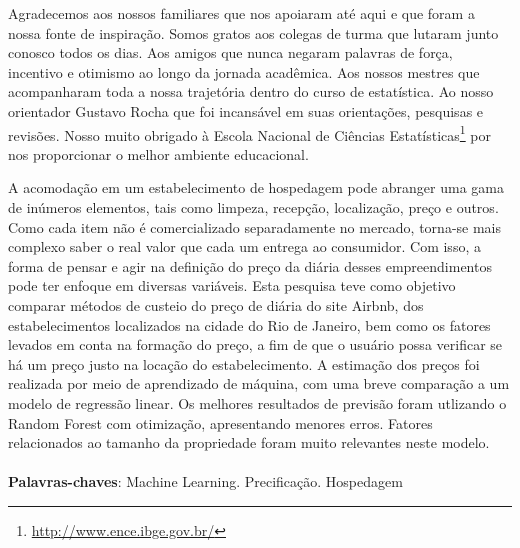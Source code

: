 \documentclass[
	12pt,				%
	a4paper,		%
	oneside,    %
	chapter=TITLE,		   %
	section=TITLE,		   %
	subsection=TITLE,	   %
	subsubsection=TITLE, %
	english,			%
	french,				%
	spanish,			%
	brazil,				%
]{abntex2}
\begin{document}
\pretextual

\makeindex

\imprimircapa

\imprimirfolhaderosto*


\imprimitfolhadeaprovacao

\begin{agradecimentos}
	Agradecemos aos nossos familiares que nos apoiaram até aqui e que foram
a nossa fonte de inspiração. Somos gratos aos colegas de turma que
lutaram junto conosco todos os dias. Aos amigos que nunca negaram
palavras de força, incentivo e otimismo ao longo da jornada acadêmica.
Aos nossos mestres que acompanharam toda a nossa trajetória dentro do
curso de estatística. Ao nosso orientador Gustavo Rocha que foi
incansável em suas orientações, pesquisas e revisões. Nosso muito
obrigado à Escola Nacional de Ciências
Estatísticas\footnote{\url{http://www.ence.ibge.gov.br/}} por nos
proporcionar o melhor ambiente educacional.
\end{agradecimentos}


\setlength{\absparsep}{18pt} %
\begin{resumo}
	A acomodação em um estabelecimento de hospedagem pode abranger uma gama
de inúmeros elementos, tais como limpeza, recepção, localização, preço e
outros. Como cada item não é comercializado separadamente no mercado,
torna-se mais complexo saber o real valor que cada um entrega ao
consumidor. Com isso, a forma de pensar e agir na definição do preço da
diária desses empreendimentos pode ter enfoque em diversas variáveis.
Esta pesquisa teve como objetivo comparar métodos de custeio do preço de
diária do site Airbnb, dos estabelecimentos localizados na cidade do Rio
de Janeiro, bem como os fatores levados em conta na formação do preço, a
fim de que o usuário possa verificar se há um preço justo na locação do
estabelecimento. A estimação dos preços foi realizada por meio de
aprendizado de máquina, com uma breve comparação a um modelo de
regressão linear. Os melhores resultados de previsão foram utlizando o
Random Forest com otimização, apresentando menores erros. Fatores
relacionados ao tamanho da propriedade foram muito relevantes neste
modelo.
	\noindent
	\\
	\\
	\textbf{Palavras-chaves}: Machine Learning. Precificação. Hospedagem
\end{resumo}
\end{document}
